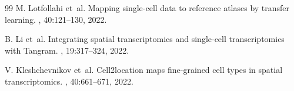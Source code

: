 \documentclass[11pt]{article}
\numberwithin{equation}{section}
\begin{document}
\begin{thebibliography}{99}
M. Lotfollahi et~al.
\newblock Mapping single-cell data to reference atlases by transfer learning.
, 40:121--130, 2022.

B. Li et~al.
\newblock Integrating spatial transcriptomics and single-cell transcriptomics with
Tangram.
, 19:317--324, 2022.

V. Kleshchevnikov et~al.
\newblock Cell2location maps fine-grained cell types in spatial transcriptomics.
, 40:661--671, 2022.

\end{thebibliography}
\end{document}
